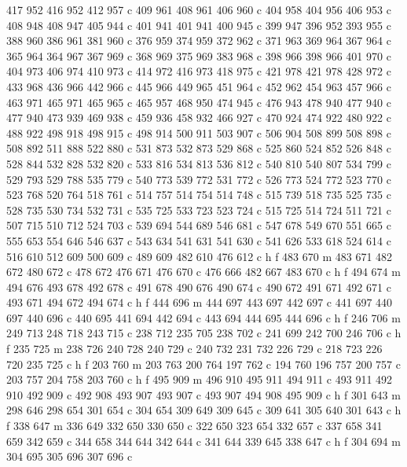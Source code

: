 {{   417 952 416 952 412 957 c
   409 961 408 961 406 960 c
   404 958 404 956 406 953 c
   408 948 408 947 405 944 c
   401 941 401 941 400 945 c
   399 947 396 952 393 955 c
   388 960 386 961 381 960 c
   376 959 374 959 372 962 c
   371 963 369 964 367 964 c
   365 964 364 967 367 969 c
   368 969 375 969 383 968 c
   398 966 398 966 401 970 c
   404 973 406 974 410 973 c
   414 972 416 973 418 975 c
   421 978 421 978 428 972 c
   433 968 436 966 442 966 c
   445 966 449 965 451 964 c
   452 962 454 963 457 966 c
   463 971 465 971 465 965 c
   465 957 468 950 474 945 c
   476 943 478 940 477 940 c
   477 940 473 939 469 938 c
   459 936 458 932 466 927 c
   470 924 474 922 480 922 c
   488 922 498 918 498 915 c
   498 914 500 911 503 907 c
   506 904 508 899 508 898 c
   508 892 511 888 522 880 c
   531 873 532 873 529 868 c
   525 860 524 852 526 848 c
   528 844 532 828 532 820 c
   533 816 534 813 536 812 c
   540 810 540 807 534 799 c
   529 793 529 788 535 779 c
   540 773 539 772 531 772 c
   526 773 524 772 523 770 c
   523 768 520 764 518 761 c
   514 757 514 754 514 748 c
   515 739 518 735 525 735 c
   528 735 530 734 532 731 c
   535 725 533 723 523 724 c
   515 725 514 724 511 721 c
   507 715 510 712 524 703 c
   539 694 544 689 546 681 c
   547 678 549 670 551 665 c
   555 653 554 646 546 637 c
   543 634 541 631 541 630 c
   541 626 533 618 524 614 c
   516 610 512 609 500 609 c
   489 609 482 610 476 612 c
   h f
   483 670 m
   483 671 482 672 480 672 c
   478 672 476 671 476 670 c
   476 666 482 667 483 670 c
   h f
   494 674 m
   494 676 493 678 492 678 c
   491 678 490 676 490 674 c
   490 672 491 671 492 671 c
   493 671 494 672 494 674 c
   h f
   444 696 m
   444 697 443 697 442 697 c
   441 697 440 697 440 696 c
   440 695 441 694 442 694 c
   443 694 444 695 444 696 c
   h f
   246 706 m
   249 713 248 718 243 715 c
   238 712 235 705 238 702 c
   241 699 242 700 246 706 c
   h f
   235 725 m
   238 726 240 728 240 729 c
   240 732 231 732 226 729 c
   218 723 226 720 235 725 c
   h f
   203 760 m
   203 763 200 764 197 762 c
   194 760 196 757 200 757 c
   203 757 204 758 203 760 c
   h f
   495 909 m
   496 910 495 911 494 911 c
   493 911 492 910 492 909 c
   492 908 493 907 493 907 c
   493 907 494 908 495 909 c
   h f
   301 643 m
   298 646 298 654 301 654 c
   304 654 309 649 309 645 c
   309 641 305 640 301 643 c
   h f
   338 647 m
   336 649 332 650 330 650 c
   322 650 323 654 332 657 c
   337 658 341 659 342 659 c
   344 658 344 644 342 644 c
   341 644 339 645 338 647 c
   h f
   304 694 m
   304 695 305 696 307 696 c
}}

